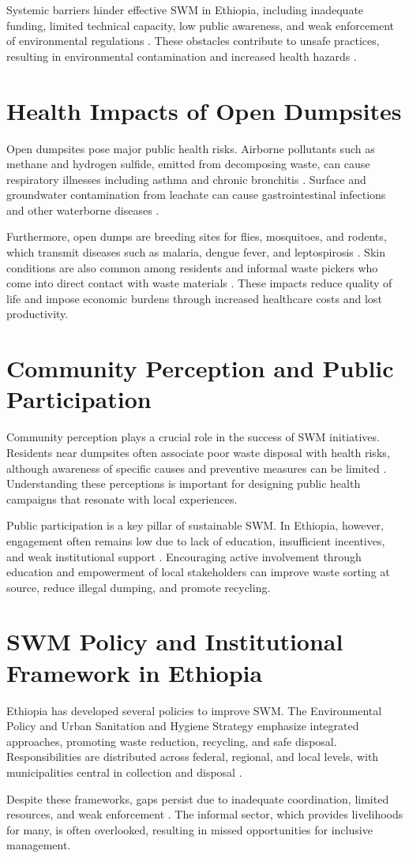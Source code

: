 Systemic barriers hinder effective SWM in Ethiopia, including inadequate funding, limited technical capacity, low public awareness, and weak enforcement of environmental regulations \cite{WorldBank2018}. These obstacles contribute to unsafe practices, resulting in environmental contamination and increased health hazards \cite{UNEP2018}.

\section{Health Impacts of Open Dumpsites}
Open dumpsites pose major public health risks. Airborne pollutants such as methane and hydrogen sulfide, emitted from decomposing waste, can cause respiratory illnesses including asthma and chronic bronchitis \cite{Ferronato2019, Ndejjo2016}. Surface and groundwater contamination from leachate can cause gastrointestinal infections and other waterborne diseases \cite{Porta2009, WHO2018}.

Furthermore, open dumps are breeding sites for flies, mosquitoes, and rodents, which transmit diseases such as malaria, dengue fever, and leptospirosis \cite{Wilson2015, Bogale2019}. Skin conditions are also common among residents and informal waste pickers who come into direct contact with waste materials \cite{Abebe2018}. These impacts reduce quality of life and impose economic burdens through increased healthcare costs and lost productivity.

\section{Community Perception and Public Participation}
Community perception plays a crucial role in the success of SWM initiatives. Residents near dumpsites often associate poor waste disposal with health risks, although awareness of specific causes and preventive measures can be limited \cite{Kibreab2020}. Understanding these perceptions is important for designing public health campaigns that resonate with local experiences.

Public participation is a key pillar of sustainable SWM. In Ethiopia, however, engagement often remains low due to lack of education, insufficient incentives, and weak institutional support \cite{Gebremedhin2018}. Encouraging active involvement through education and empowerment of local stakeholders can improve waste sorting at source, reduce illegal dumping, and promote recycling.

\section{SWM Policy and Institutional Framework in Ethiopia}
Ethiopia has developed several policies to improve SWM. The Environmental Policy \cite{EPA2017} and Urban Sanitation and Hygiene Strategy \cite{FMoH2016} emphasize integrated approaches, promoting waste reduction, recycling, and safe disposal. Responsibilities are distributed across federal, regional, and local levels, with municipalities central in collection and disposal \cite{WorldBank2018}.

Despite these frameworks, gaps persist due to inadequate coordination, limited resources, and weak enforcement \cite{Gebremedhin2018}. The informal sector, which provides livelihoods for many, is often overlooked, resulting in missed opportunities for inclusive management.
